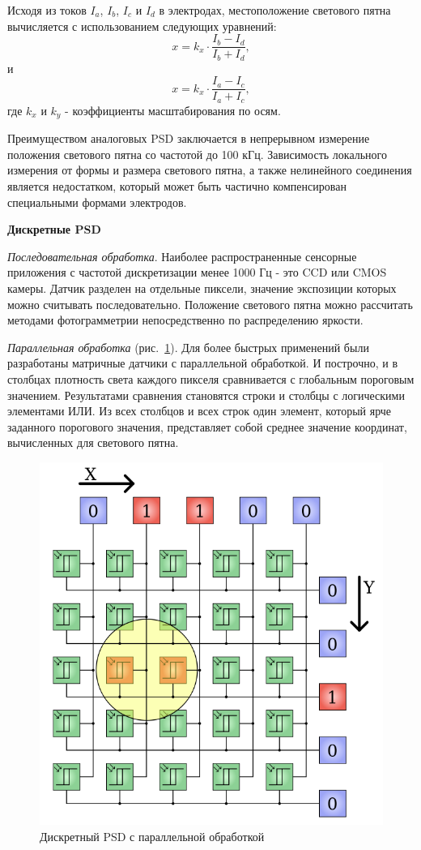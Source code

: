 \documentclass[12pt]{article}
\begin{document}
Исходя из токов \(I_{a}\), \(I_{b}\), \(I_{c}\) и \(I_{d}\) в электродах, местоположение светового пятна вычисляется с использованием следующих уравнений:
\[x=k_{x}\cdot\frac{I_{b}-I_{d}}{I_{b}+I_{d}},\]
и
\[x=k_{x}\cdot\frac{I_{a}-I_{c}}{I_{a}+I_{c}},\]
где \(k_{x}\) и \(k_{y}\) - коэффициенты масштабирования по осям.

Преимуществом аналоговых PSD заключается в непрерывном измерение положения светового пятна со частотой до 100 кГц. Зависимость локального измерения от формы и размера светового пятна, а также нелинейного соединения является недостатком, который может быть частично компенсирован специальными формами электродов.

\textbf{Дискретные PSD}

\textit{Последовательная обработка}. Наиболее распространенные сенсорные приложения с частотой дискретизации менее 1000 Гц - это CCD или CMOS камеры. Датчик разделен на отдельные пиксели, значение экспозиции которых можно считывать последовательно. Положение светового пятна можно рассчитать методами фотограмметрии непосредственно по распределению яркости.

\textit{Параллельная обработка} (рис.~\ref{psddiscrete}). Для более быстрых применений были разработаны матричные датчики с параллельной обработкой. И построчно, и в столбцах плотность света каждого пикселя сравнивается с глобальным пороговым значением. Результатами сравнения становятся строки и столбцы с логическими элементами ИЛИ. Из всех столбцов и всех строк один элемент, который ярче заданного порогового значения, представляет собой среднее значение координат, вычисленных для светового пятна.

\begin{figure}[H]
    \centering
    \includegraphics[scale=0.3]{images/psd-discrete.png}
    \caption{Дискретный PSD с параллельной обработкой}\label{psddiscrete}
\end{figure}
\end{document}
